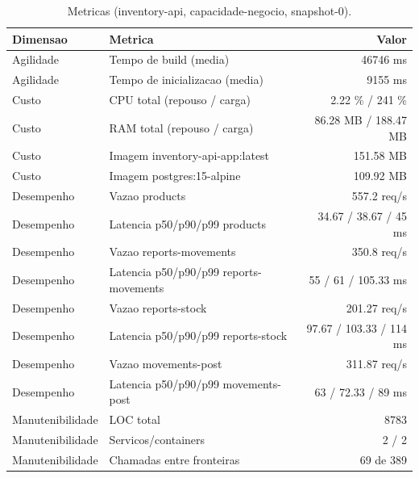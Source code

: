 \begin{table}[htb]
  \centering
  \caption{Metricas (inventory-api, capacidade-negocio, snapshot-0).}
  \label{tab:metricas-inventory-api-capacidade-negocio-snapshot-0}
  \begin{tabular}{llr}
    \hline
    \textbf{Dimensao} & \textbf{Metrica} & \textbf{Valor} \\
    \hline
    Agilidade & Tempo de build (media) & 46746 ms \\
    Agilidade & Tempo de inicializacao (media) & 9155 ms \\
    Custo & CPU total (repouso / carga) & 2.22 \% / 241 \% \\
    Custo & RAM total (repouso / carga) & 86.28 MB / 188.47 MB \\
    Custo & Imagem inventory-api-app:latest & 151.58 MB \\
    Custo & Imagem postgres:15-alpine & 109.92 MB \\
    Desempenho & Vazao products & 557.2 req/s \\
    Desempenho & Latencia p50/p90/p99 products & 34.67 / 38.67 / 45 ms \\
    Desempenho & Vazao reports-movements & 350.8 req/s \\
    Desempenho & Latencia p50/p90/p99 reports-movements & 55 / 61 / 105.33 ms \\
    Desempenho & Vazao reports-stock & 201.27 req/s \\
    Desempenho & Latencia p50/p90/p99 reports-stock & 97.67 / 103.33 / 114 ms \\
    Desempenho & Vazao movements-post & 311.87 req/s \\
    Desempenho & Latencia p50/p90/p99 movements-post & 63 / 72.33 / 89 ms \\
    Manutenibilidade & LOC total & 8783 \\
    Manutenibilidade & Servicos/containers & 2 / 2 \\
    Manutenibilidade & Chamadas entre fronteiras & 69 de 389 \\
    \hline
  \end{tabular}
\end{table}
